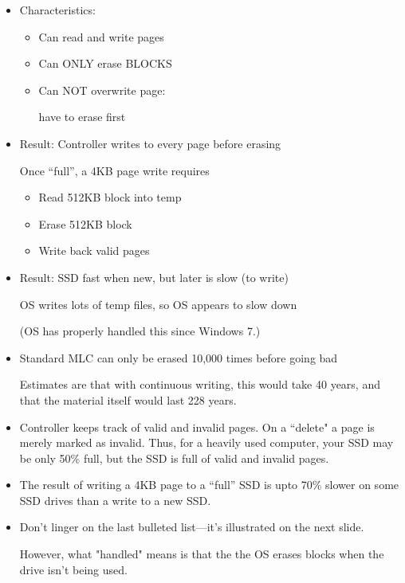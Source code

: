 \begin{frame}[fragile]
\begin{itemize}
	\item Characteristics:
	\begin{itemize}
		\item Can read and write pages
		\item Can ONLY erase BLOCKS
		\item Can NOT overwrite page: 

			have to erase first
	\end{itemize}
	\item Result: Controller writes to every page before erasing

	Once ``full'', a 4KB page write requires
	\begin{itemize}
		\item Read 512KB block into temp
		\item Erase 512KB block
		\item Write back valid pages 
	\end{itemize}
	\item Result: SSD fast when new, but later is slow (to write)

		OS writes lots of temp files, so OS appears to slow down

		(OS has properly handled this since Windows 7.)
\end{itemize}
\BNotes\ifnum{}
\begin{itemize}
\item Standard MLC can only be erased 10,000 times before going bad

	Estimates are that with continuous writing, this would take 40 years,
	and that the material itself would last 228 years.
\item Controller keeps track of valid and invalid pages.  On a ``delete"
	a page is merely marked as invalid.  Thus, for a heavily used
	computer, your SSD may be only 50\% full, but the SSD is full
	of valid and invalid pages.

\item The result of writing a 4KB page to a ``full'' SSD 
	is upto 70\% slower on
	some SSD drives than a write to a new SSD.
\item Don't linger on the last bulleted list---it's illustrated on the
	next slide.

	However, what "handled" means is that the the OS erases blocks when
	the drive isn't being used.
\end{itemize}
\fi\ENotes
\end{frame}

